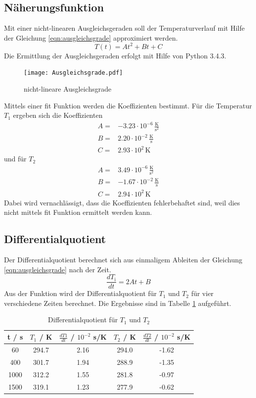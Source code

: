 \subsection{Näherungsfunktion}
Mit einer nicht-linearen Ausgleichsgeraden soll der Temperaturverlauf mit Hilfe der Gleichung \ref{eqn:ausgleichsgrade} approximiert werden.
\begin{equation}
  T(t) = At^2 + Bt +C
  \label{eqn:ausgleichsgrade}
\end{equation}
Die Ermittlung der Ausgleichsgeraden erfolgt mit Hilfe von Python 3.4.3.
\begin{figure}
  \centering
  \texttt{[image: Ausgleichsgrade.pdf]}
  \caption{nicht-lineare Ausgleichsgrade}
  \label{fig:ausg}
\end{figure}
Mittels einer fit Funktion werden die Koeffizienten bestimmt. Für die Temperatur $T_\text{1}$ ergeben sich die Koeffizienten
\begin{eqnarray*}
  A =& -3.23 \cdot 10^{-6} \, \frac{\text{K}}{\text{s}^2}	\\
  B =& 2.20 \cdot 10^{-2} \, \frac{\text{K}}{\text{s}} 	\\
  C =& 2.93 \cdot 10^{2} \, \text{K}
  \label{eqn:koefT1}
\end{eqnarray*}
und für $T_\text{2}$
\begin{eqnarray*}
  A =& 3.49 \cdot 10^{-6} \, \frac{\text{K}}{\text{s}^2} 	\\
  B =& -1.67 \cdot 10^{-2} \, \frac{\text{K}}{\text{s}} 	\\
  C =& 2.94 \cdot 10^2 \, \text{K}
  \label{eqn:koefT2}
\end{eqnarray*}
Dabei wird vernachlässigt, dass die Koeffizienten fehlerbehaftet sind, weil dies nicht mittels fit Funktion ermittelt werden kann.
\subsection{Differentialquotient}
Der Differentialquotient berechnet sich aus einmaligem Ableiten der Gleichung \ref{eqn:ausgleichsgrade} nach der Zeit.
\begin{equation}
  \frac{dT_\text{i}}{dt} = 2At + B
  \label{eqn:diffq}
\end{equation}
Aus der Funktion wird der Differentialquotient für $T_\text{1}$ und $T_\text{2}$ für vier verschiedene Zeiten berechnet. Die Ergebnisse sind in Tabelle \ref{tab:diffQ} aufgeführt.
\begin{table}
  \centering
  \begin{tabular}{c c c c c}
  	\toprule
	t / s & $T_\text{1}$ / K & $\frac{dT1}{dt}$ / $10^{-2}$ s/K & $T_\text{2}$ / K & $\frac{dT2}{dt}$ / $10^{-2}$ s/K \\
	\midrule
	60	  & 294.7   & 2.16 & 294.0 & -1.62 \\
	400	  & 301.7   & 1.94 & 288.9 & -1.35 \\
	1000	& 312.2   & 1.55 & 281.8 & -0.97 \\
	1500	& 319.1   & 1.23 & 277.9 & -0.62 \\
	\bottomrule
  \end{tabular}
  \caption{Differentialquotient für $T_\text{1}$ und $T_\text{2}$}
  \label{tab:diffQ}
\end{table}

